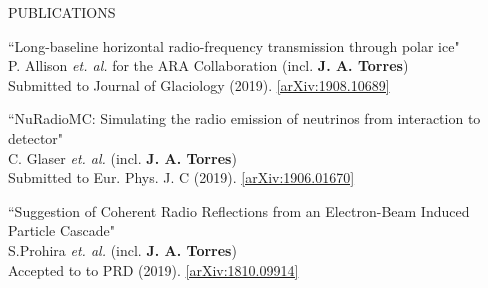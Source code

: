 \documentclass{resume} %
\begin{document}
\begin{rSection}{PUBLICATIONS}
\begin{etaremune}%
  \item ``Long-baseline horizontal radio-frequency transmission through polar ice" \\
 P. Allison {\it et. al.} for the ARA Collaboration (incl. \textbf{J. A. Torres})\\    Submitted to Journal of Glaciology (2019). \href{https://arxiv.org/abs/1908.10689}{[arXiv:1908.10689]}
  \item ``NuRadioMC: Simulating the radio emission of neutrinos from interaction to detector" \\
 C. Glaser {\it et. al.} (incl. \textbf{J. A. Torres})\\    Submitted to Eur. Phys. J. C (2019). \href{https://arxiv.org/abs/1906.01670}{[arXiv:1906.01670]} 
  \item ``Suggestion of Coherent Radio Reflections from an Electron-Beam Induced Particle Cascade" \\
 S.Prohira {\it et. al.} (incl. \textbf{J. A. Torres})\\    Accepted to to PRD (2019). \href{https://arxiv.org/abs/1810.09914}{[arXiv:1810.09914]} 
 
 \end{etaremune}
\end{rSection}

\end{document}
